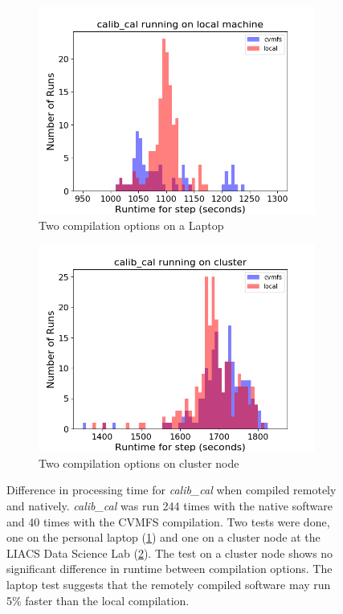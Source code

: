 \begin{figure}
  \centering
     \begin{subfigure}{.45\linewidth}
    \includegraphics[width=\linewidth]{ch4/figures/ppr2_calib_local.png}
    \caption{Two compilation options on a Laptop}
	\label{fig:cmvfs1_calib}
    \end{subfigure}%
    \begin{subfigure}{.45\linewidth}
     \includegraphics[width=\linewidth]{ch4/figures/ppr2_calib_cluster.png}
    \caption{Two compilation options on cluster node}
	\label{fig:cmvfs2_calib}
    \end{subfigure}%
      \caption{Difference in processing time for \textit{calib\_cal} when compiled remotely and natively. \textit{calib\_cal} was run 244 times with the native software and 40 times with the CVMFS compilation. Two tests were done, one on the personal laptop (\ref{fig:cmvfs1_calib}) and one on a cluster node at the LIACS Data Science Lab (\ref{fig:cmvfs2_calib}). The test on a cluster node shows no significant difference in runtime between compilation options. The laptop test suggests that the remotely compiled software may run 5\% faster than the local compilation. } 
	\label{fig:cvmfs_native}
\end{figure}


